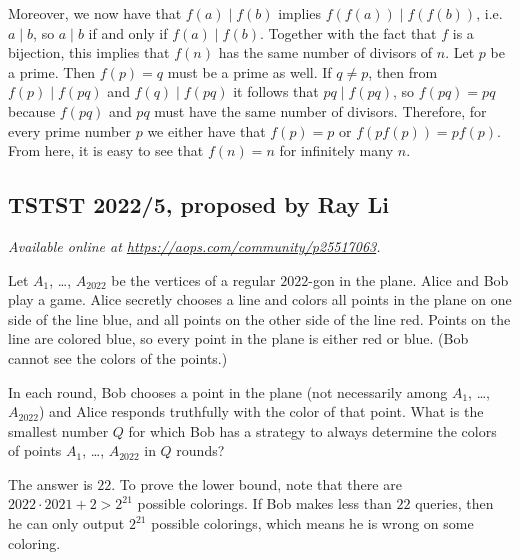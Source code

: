 \documentclass[11pt]{scrartcl}
\begin{document}
Moreover, we now have that $f(a) \mid f(b)$ implies $f(f(a)) \mid f(f(b))$,
i.e.\ $a \mid b$, so $a \mid b$ if and only if $f(a) \mid f(b)$.
Together with the fact that $f$ is a bijection,
this implies that $f(n)$ has the same number of divisors of $n$.
Let $p$ be a prime. Then $f(p)=q$ must be a prime as well.
If $q \neq p$, then from $f(p) \mid f(pq)$
and $f(q) \mid f(pq)$ it follows that $pq \mid f(pq)$, so $f(pq) = pq$
because $f(pq)$ and $pq$ must have the same number of divisors.
Therefore, for every prime number $p$ we either have that $f(p)=p$
or $f(pf(p)) = pf(p)$.
From here, it is easy to see that $f(n)=n$ for infinitely many $n$.
\pagebreak

\subsection{TSTST 2022/5, proposed by Ray Li}
\textsl{Available online at \url{https://aops.com/community/p25517063}.}
\begin{mdframed}[style=mdpurplebox,frametitle={Problem statement}]
Let $A_1$, \dots, $A_{2022}$ be the vertices of a regular $2022$-gon in the plane.
Alice and Bob play a game.
Alice secretly chooses a line and colors all points in the plane
on one side of the line blue, and all points on the other side of the line red.
Points on the line are colored blue,
so every point in the plane is either red or blue.
(Bob cannot see the colors of the points.)

In each round, Bob chooses a point in the
plane (not necessarily among $A_1$, \dots, $A_{2022}$)
and Alice responds truthfully with the color of that point.
What is the smallest number $Q$ for which Bob has a strategy to
always determine the colors of points $A_1$, \dots, $A_{2022}$ in $Q$ rounds?
\end{mdframed}
The answer is $22$.
To prove the lower bound, note that there are
$2022\cdot 2021 + 2 > 2^{21}$ possible colorings.
If Bob makes less than $22$ queries,
then he can only output $2^{21}$ possible colorings,
which means he is wrong on some coloring.
\end{document}
